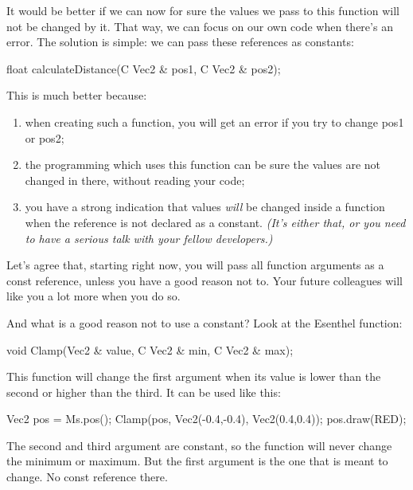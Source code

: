 It would be better if we can now for sure the values we pass to this function will not be changed by it. That way, we can focus on our own code when there's an error. The solution is simple: we can pass these references as constants:

\begin{code}
float calculateDistance(C Vec2 & pos1, C Vec2 & pos2);
\end{code}

This is much better because:

\begin{enumerate}
	\item when creating such a function, you will get an error if you try to change pos1 or pos2;
	\item the programming which uses this function can be sure the values are not changed in there, without reading your code;
	\item you have a strong indication that values \textit{will} be changed inside a function when the reference is not declared as a constant. \textit{(It's either that, or you need to have a serious talk with your fellow developers.)}
\end{enumerate}

Let's agree that, starting right now, you will pass all function arguments as a const reference, unless you have a good reason not to. Your future colleagues will like you a lot more when you do so.

And what is a good reason not to use a constant? Look at the Esenthel  function:
\begin{code}
void Clamp(Vec2 & value, C Vec2 & min, C Vec2 & max);
\end{code}

This function will change the first argument when its value is lower than the second or higher than the third. It can be used like this:

\begin{code}
Vec2 pos = Ms.pos();
Clamp(pos, Vec2(-0.4,-0.4), Vec2(0.4,0.4));
pos.draw(RED);
\end{code}

The second and third argument are constant, so the function will never change the minimum or maximum. But the first argument is the one that is meant to change. No const reference there.

